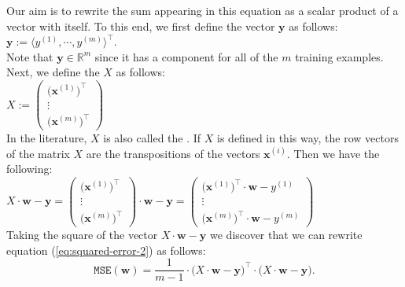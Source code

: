 Our aim is to rewrite the sum appearing in this equation as a scalar product of a vector with
itself.  To this end, we first define the vector $\mathbf{y}$ as follows:
\\[0.2cm]
\hspace*{1.3cm}
$\mathbf{y} := \langle y^{(1)}, \cdots, y^{(m)} \rangle^\top$.
\\[0.2cm]
Note that $\mathbf{y} \in \mathbb{R}^m$ since it has a component for all of the $m$ training
examples.  Next, we define the   $X$ as follows:
\\[0.2cm]
\hspace*{1.3cm}
$X := \left(
  \begin{array}{c}
    \bigl(\mathbf{x}^{(1)}\bigr)^\top  \\
    \vdots                         \\
    \bigl(\mathbf{x}^{(m)}\bigr)^\top
  \end{array}
  \right)   
$
\\[0.2cm]
In the literature, $X$ is also called the . 
If $X$ is defined in this way, the row vectors of the matrix $X$ are the transpositions of the vectors $\mathbf{x}^{(i)}$.
Then we have the following:
\\[0.2cm]
\hspace*{1.3cm}
$X \cdot \mathbf{w} - \mathbf{y} = \left(
  \begin{array}{c}
    \bigl(\mathbf{x}^{(1)}\bigr)^\top  \\
    \vdots                         \\
    \bigl(\mathbf{x}^{(m)}\bigr)^\top
  \end{array}
  \right) \cdot \mathbf{w} - \mathbf{y} = \left(
  \begin{array}{c}
    \bigl(\mathbf{x}^{(1)}\bigr)^\top \cdot \mathbf{w} - y^{(1)} \\
    \vdots                         \\
    \bigl(\mathbf{x}^{(m)}\bigr)^\top \cdot \mathbf{w} - y^{(m)}
  \end{array}
  \right)
$
\\[0.2cm]
Taking the square of the vector $X \cdot \mathbf{w} - \mathbf{y}$ we discover that
we can rewrite equation (\ref{eq:squared-error-2}) as follows:
\begin{equation}
  \label{eq:squared-error-3}
  \mathtt{MSE}(\mathbf{w}) = \frac{1}{m-1} \cdot \bigl(X \cdot \mathbf{w} - \textbf{y}\bigr)^\top \cdot 
                                            \bigl(X \cdot \mathbf{w} - \textbf{y}\bigr).
\end{equation}

